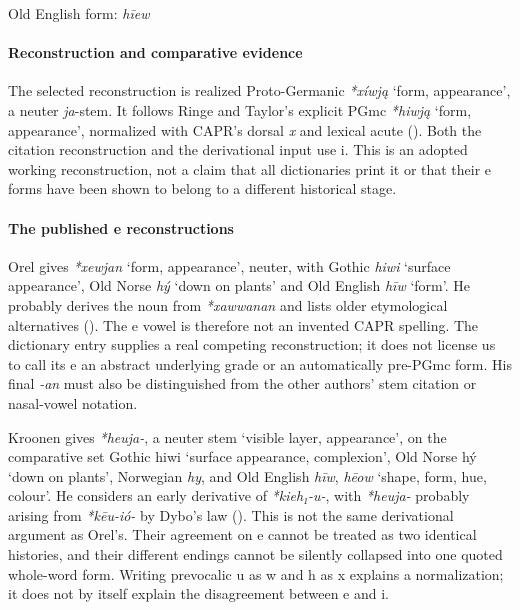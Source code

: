 \documentclass[
  british,
  a4paper,
]{article}
\providecommand{\Recon}[1]{\emph{*#1}}
\begin{document}
Old English form: \emph{hīew}

\paragraph{Reconstruction and comparative
evidence}\label{reconstruction-and-comparative-evidence-77}

The selected reconstruction is realized Proto-Germanic \emph{*xíwją}
`form, appearance', a neuter \emph{ja}-stem. It follows Ringe and
Taylor's explicit PGmc \Recon{hiwją} `form, appearance', normalized with
CAPR's dorsal \emph{x} and lexical acute
(). Both the
citation reconstruction and the derivational input use i. This is an
adopted working reconstruction, not a claim that all dictionaries print
it or that their e forms have been shown to belong to a different
historical stage.

\paragraph{The published e
reconstructions}\label{the-published-e-reconstructions}

Orel gives \Recon{xewjan} `form, appearance', neuter, with Gothic
\emph{hiwi} `surface appearance', Old Norse \emph{hý} `down on plants'
and Old English \emph{hīw} `form'. He probably derives the noun from
\emph{*xawwanan} and lists older etymological alternatives
(). The e vowel is therefore
not an invented CAPR spelling. The dictionary entry supplies a real
competing reconstruction; it does not license us to call its e an
abstract underlying grade or an automatically pre-PGmc form. His final
\emph{-an} must also be distinguished from the other authors' stem
citation or nasal-vowel notation.

Kroonen gives \Recon{heuja-}, a neuter stem `visible layer, appearance',
on the comparative set Gothic {hiwi} `surface appearance, complexion',
Old Norse {hý} `down on plants', Norwegian \emph{hy}, and Old English
\emph{hīw}, \emph{hēow} `shape, form, hue, colour'. He considers an
early derivative of \emph{*kieh₁-u-}, with \emph{*heuja-} probably
arising from \emph{*kēu-ió-} by Dybo's law
(). This is not the same
derivational argument as Orel's. Their agreement on e cannot be treated
as two identical histories, and their different endings cannot be
silently collapsed into one quoted whole-word form. Writing prevocalic u
as w and h as x explains a normalization; it does not by itself explain
the disagreement between e and i.
\end{document}
